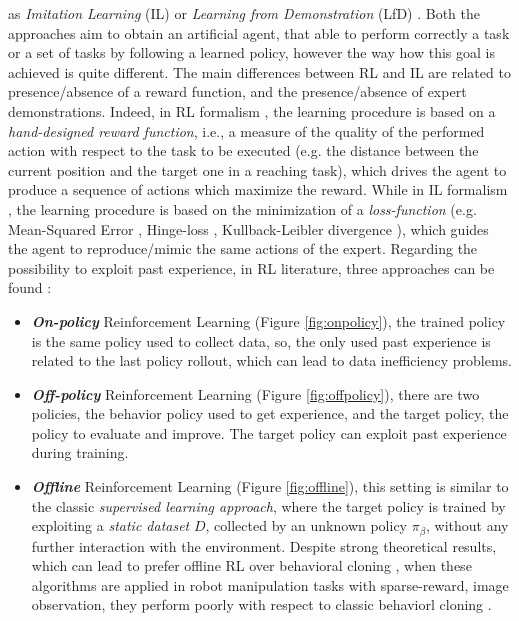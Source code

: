 as \textit{Imitation Learning} (IL) or \textit{Learning from Demonstration} (LfD)
\cite{argall2009robot_learning_from_demonstration}. Both the approaches aim to obtain an artificial agent, that able to
perform correctly a task or a set of tasks by following a learned policy, however the way how this goal is achieved is
quite different. The main differences between RL and IL are related to presence/absence of a reward function, and the
presence/absence of expert demonstrations. \newline Indeed, in RL formalism \cite{kaelbling1996reinforcement_survey},
the learning procedure is based on a \textit{hand-designed reward function}, i.e., a measure of the quality of the
performed action with respect to the task to be executed (e.g. the distance between the current position and the target
one in a reaching task), which drives the agent to produce a sequence of actions which maximize the reward.
While in IL formalism \cite{osa2018algorithmic}, the learning procedure is based on the minimization of a
\textit{loss-function} (e.g. Mean-Squared Error \cite{james2013introduction_to_sl}, Hinge-loss \cite{cortes1995support},
Kullback-Leibler divergence \cite{kullback1951information}), which guides the agent to reproduce/mimic the same actions
of the expert. \newline Regarding the possibility to exploit past experience, in RL literature, three approaches can be
found \cite{levine202rl_tutorial}:
\begin{itemize}
    \item \textbf{\textit{On-policy}} Reinforcement Learning (Figure \ref{fig:onpolicy}), the trained policy is the same
    policy used to collect data, so, the only used past experience is related to the last policy rollout, which can lead to data inefficiency problems.
    \item \textbf{\textit{Off-policy}} Reinforcement Learning (Figure \ref{fig:offpolicy}), there are two policies, the
    behavior policy used to get experience, and the target policy, the policy to evaluate and improve. The target policy
    can exploit past experience during training.
    \item \textbf{\textit{Offline}} Reinforcement Learning (Figure \ref{fig:offline}), this setting is similar to the
    classic \textit{supervised learning approach}, where the target policy is trained by exploiting a \textit{static dataset} $D$,
    collected by an unknown policy $\pi_{\beta}$, without any further interaction with the environment. Despite strong theoretical results, which can lead to prefer offline RL over behavioral cloning \cite{kumar2021orl_vs_bc}, when these algorithms are applied in robot manipulation tasks with sparse-reward, image observation, they perform poorly with respect to classic behaviorl cloning \cite{mandlekar2022matters}.
\end{itemize}
